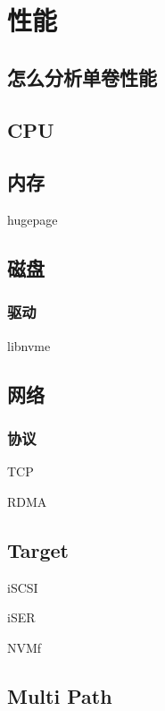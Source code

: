 \chapter{性能}

\section{怎么分析单卷性能}

\section{CPU}

\section{内存}

hugepage

\section{磁盘}

\subsection{驱动}

libnvme

\section{网络}

\subsection{协议}

\begin{enumbox}
\item TCP
\item RDMA
\end{enumbox}

\section{Target}

\begin{enumbox}
\item iSCSI
\item iSER
\item NVMf
\end{enumbox}

\section{Multi Path}


